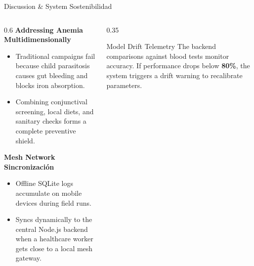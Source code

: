 \documentclass[aspectratio=169]{beamer}
\begin{document}
\begin{frame}{Discussion \& System Sostenibilidad}
    \begin{columns}[T]
        \begin{column}{0.6\textwidth}
            \textbf{Addressing Anemia Multidimensionally}
            \begin{itemize}
                \item Traditional campaigns fail because child parasitosis causes gut bleeding and blocks iron absorption.
                \item Combining conjunctival screening, local diets, and sanitary checks forms a complete preventive shield.
            \end{itemize}
            \vspace{0.2cm}
            \textbf{Mesh Network Sincronización}
            \begin{itemize}
                \item Offline SQLite logs accumulate on mobile devices during field runs.
                \item Syncs dynamically to the central Node.js backend when a healthcare worker gets close to a local mesh gateway.
            \end{itemize}
        \end{column}
        \begin{column}{0.35\textwidth}
            \begin{block}{Model Drift Telemetry}
                The backend comparisons against blood tests monitor accuracy. If performance drops below \textbf{80\%}, the system triggers a drift warning to recalibrate parameters.
            \end{block}
        \end{column}
    \end{columns}
\end{frame}
\end{document}

